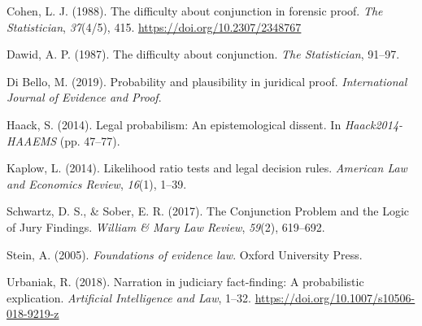 \documentclass[10pt,dvipsnames,enabledeprecatedfontcommands]{scrartcl}
\begin{document}
\leavevmode\hypertarget{ref-cohen1988difficulty}{}%
Cohen, L. J. (1988). The difficulty about conjunction in forensic proof.
\emph{The Statistician}, \emph{37}(4/5), 415.
\url{https://doi.org/10.2307/2348767}

\leavevmode\hypertarget{ref-dawid1987difficulty}{}%
Dawid, A. P. (1987). The difficulty about conjunction. \emph{The
Statistician}, 91--97.

\leavevmode\hypertarget{ref-DiBello2019plausibility}{}%
Di Bello, M. (2019). Probability and plausibility in juridical proof.
\emph{International Journal of Evidence and Proof}.

\leavevmode\hypertarget{ref-haack2011legal}{}%
Haack, S. (2014). Legal probabilism: An epistemological dissent. In
\emph{Haack2014-HAAEMS} (pp. 47--77).

\leavevmode\hypertarget{ref-kaplow2014likelihood}{}%
Kaplow, L. (2014). Likelihood ratio tests and legal decision rules.
\emph{American Law and Economics Review}, \emph{16}(1), 1--39.

\leavevmode\hypertarget{ref-schwartz2017ConjunctionProblemLogic}{}%
Schwartz, D. S., \& Sober, E. R. (2017). The Conjunction Problem and the
Logic of Jury Findings. \emph{William \& Mary Law Review}, \emph{59}(2),
619--692.

\leavevmode\hypertarget{ref-Stein05}{}%
Stein, A. (2005). \emph{Foundations of evidence law}. Oxford University
Press.

\leavevmode\hypertarget{ref-urbaniak2018narration}{}%
Urbaniak, R. (2018). Narration in judiciary fact-finding: A
probabilistic explication. \emph{Artificial Intelligence and Law},
1--32. \url{https://doi.org/10.1007/s10506-018-9219-z}
\end{document}
